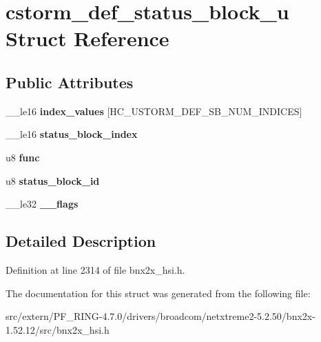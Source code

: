 \hypertarget{structcstorm__def__status__block__u}{
\section{cstorm\_\-def\_\-status\_\-block\_\-u Struct Reference}
\label{structcstorm__def__status__block__u}
}
\subsection*{Public Attributes}
\begin{DoxyCompactItemize}
\item 
\hypertarget{structcstorm__def__status__block__u_ad0f19aafeb73c87844d74addd7c140d9}{
\_\-\_\-le16 {\bfseries index\_\-values} \mbox{[}HC\_\-USTORM\_\-DEF\_\-SB\_\-NUM\_\-INDICES\mbox{]}}
\label{structcstorm__def__status__block__u_ad0f19aafeb73c87844d74addd7c140d9}

\item 
\hypertarget{structcstorm__def__status__block__u_ac6ce5734d2485ae782107abbe169b8cd}{
\_\-\_\-le16 {\bfseries status\_\-block\_\-index}}
\label{structcstorm__def__status__block__u_ac6ce5734d2485ae782107abbe169b8cd}

\item 
\hypertarget{structcstorm__def__status__block__u_afda6c8811d7cf7cea1fc542bb9df3dfb}{
u8 {\bfseries func}}
\label{structcstorm__def__status__block__u_afda6c8811d7cf7cea1fc542bb9df3dfb}

\item 
\hypertarget{structcstorm__def__status__block__u_af1b44d4092cfc97649d4dcb581ab8781}{
u8 {\bfseries status\_\-block\_\-id}}
\label{structcstorm__def__status__block__u_af1b44d4092cfc97649d4dcb581ab8781}

\item 
\hypertarget{structcstorm__def__status__block__u_a649dfd59d60510056a5c59d851308823}{
\_\-\_\-le32 {\bfseries \_\-\_\-flags}}
\label{structcstorm__def__status__block__u_a649dfd59d60510056a5c59d851308823}

\end{DoxyCompactItemize}


\subsection{Detailed Description}


Definition at line 2314 of file bnx2x\_\-hsi.h.



The documentation for this struct was generated from the following file:\begin{DoxyCompactItemize}
\item 
src/extern/PF\_\-RING-\/4.7.0/drivers/broadcom/netxtreme2-\/5.2.50/bnx2x-\/1.52.12/src/bnx2x\_\-hsi.h\end{DoxyCompactItemize}
